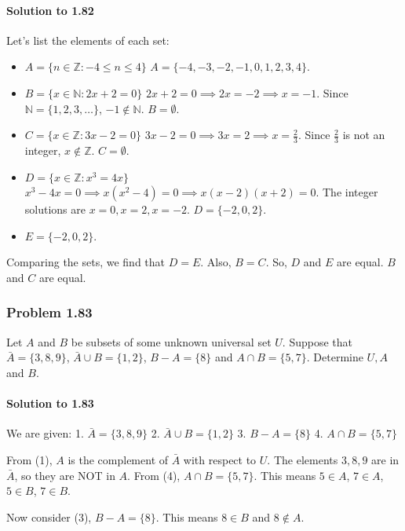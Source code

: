\documentclass{article}
\begin{document}
\paragraph*{Solution to 1.82}
Let's list the elements of each set:
\begin{itemize}
    \item $A = \{n \in \mathbb{Z} : -4 \le n \le 4\}$
    $A = \{-4, -3, -2, -1, 0, 1, 2, 3, 4\}$.
    \item $B = \{x \in \mathbb{N} : 2x + 2 = 0\}$
    $2x + 2 = 0 \implies 2x = -2 \implies x = -1$.
    Since $\mathbb{N} = \{1, 2, 3, \dots\}$, $-1 \notin \mathbb{N}$.
    $B = \emptyset$.
    \item $C = \{x \in \mathbb{Z} : 3x - 2 = 0\}$
    $3x - 2 = 0 \implies 3x = 2 \implies x = \frac{2}{3}$.
    Since $\frac{2}{3}$ is not an integer, $x \notin \mathbb{Z}$.
    $C = \emptyset$.
    \item $D = \{x \in \mathbb{Z} : x^3 = 4x\}$
    $x^3 - 4x = 0 \implies x(x^2 - 4) = 0 \implies x(x-2)(x+2) = 0$.
    The integer solutions are $x = 0, x = 2, x = -2$.
    $D = \{-2, 0, 2\}$.
    \item $E = \{-2, 0, 2\}$.
\end{itemize}
Comparing the sets, we find that $D = E$. Also, $B = C$.
So, $D$ and $E$ are equal. $B$ and $C$ are equal.

\subsubsection*{Problem 1.83}
Let $A$ and $B$ be subsets of some unknown universal set $U$. Suppose that $\bar{A} = \{3, 8, 9\}$, $\bar{A} \cup B = \{1, 2\}$, $B - A = \{8\}$ and $A \cap B = \{5, 7\}$. Determine $U, A$ and $B$.

\paragraph*{Solution to 1.83}
We are given:
1. $\bar{A} = \{3, 8, 9\}$
2. $\bar{A} \cup B = \{1, 2\}$
3. $B - A = \{8\}$
4. $A \cap B = \{5, 7\}$

From (1), $A$ is the complement of $\bar{A}$ with respect to $U$. The elements $3, 8, 9$ are in $\bar{A}$, so they are NOT in $A$.
From (4), $A \cap B = \{5, 7\}$. This means $5 \in A$, $7 \in A$, $5 \in B$, $7 \in B$.

Now consider (3), $B - A = \{8\}$. This means $8 \in B$ and $8 \notin A$.
\end{document}
